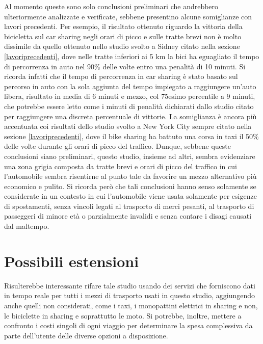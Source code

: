 Al momento queste sono solo conclusioni preliminari che andrebbero ulteriormente analizzate e verificate, sebbene presentino alcune somiglianze con lavori precedenti. Per esempio, il risultato ottenuto riguardo la vittoria della bicicletta sul car sharing negli orari di picco e sulle tratte brevi non è molto dissimile da quello ottenuto nello studio svolto a Sidney citato nella sezione \ref{lavoriprecedenti}, dove nelle tratte inferiori ai 5 km la bici ha eguagliato il tempo di percorrenza in auto nel 90\% delle volte entro una penalità di 10 minuti. Si ricorda infatti che il tempo di percorrenza in car sharing è stato basato sul percorso in auto con la sola aggiunta del tempo impiegato a raggiungere un'auto libera, risultato in media di 6 minuti e mezzo, col 75esimo percentile a 9 minuti, che potrebbe essere letto come i minuti di penalità dichiarati dallo studio citato per raggiungere una discreta percentuale di vittorie. La somiglianza è ancora più accentuata coi risultati dello studio svolto a New York City sempre citato nella sezione \ref{lavoriprecedenti}, dove il bike sharing ha battuto una corsa in taxi il 50\% delle volte durante gli orari di picco del traffico. Dunque, sebbene queste conclusioni siano preliminari, questo studio, insieme ad altri, sembra evidenziare una zona grigia composta da tratte brevi e orari di picco del traffico in cui l'automobile sembra risentirne al punto tale da favorire un mezzo alternativo più economico e pulito. Si ricorda però che tali conclusioni hanno senso solamente se considerate in un contesto in cui l'automobile viene usata solamente per esigenze di spostamenti, senza vincoli legati al trasporto di merci pesanti, al trasporto di passeggeri di minore età o parzialmente invalidi e senza contare i disagi causati dal maltempo.

\section{Possibili estensioni}

Risulterebbe interessante rifare tale studio usando dei servizi che forniscono dati in tempo reale per tutti i mezzi di trasporto usati in questo studio, aggiungendo anche quelli non considerati, come i taxi, i monopattini elettrici in sharing e non, le biciclette in sharing e soprattutto le moto. Si potrebbe, inoltre, mettere a confronto i costi singoli di ogni viaggio per determinare la spesa complessiva da parte dell'utente delle diverse opzioni a disposizione.


